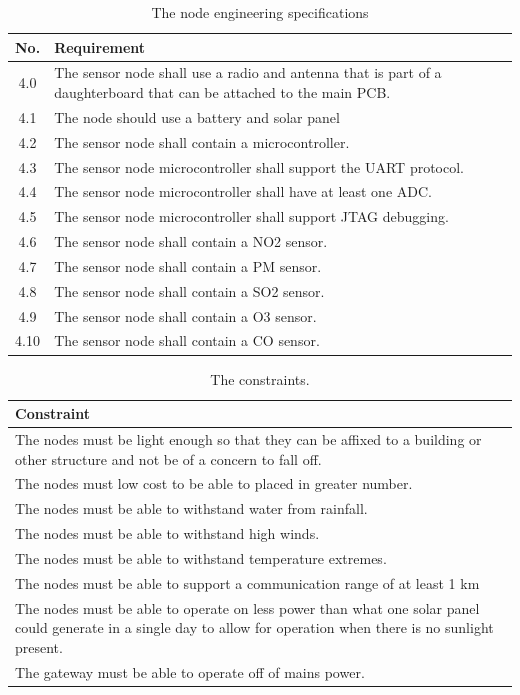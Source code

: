 \begin{table}[H]
\centering
\caption{The node engineering specifications}
\begin{tabularx}{\linewidth}{|c|X|}
\hline
No. & Requirement \\
\hline\hline
4.0 & The sensor node shall use a radio and antenna that is part of a daughterboard that can be attached to the main PCB.\\\hline
4.1 & The node should use a battery and solar panel \\\hline
4.2 & The sensor node shall contain a microcontroller. \\\hline
4.3 & The sensor node microcontroller shall support the UART protocol.\\\hline
4.4 & The sensor node microcontroller shall have at least one ADC.\\\hline
4.5 & The sensor node microcontroller shall support JTAG debugging.\\\hline
4.6 & The sensor node shall contain a NO2 sensor.\\\hline
4.7 & The sensor node shall contain a PM sensor.\\\hline
4.8 & The sensor node shall contain a SO2 sensor.\\\hline
4.9 & The sensor node shall contain a O3 sensor.\\\hline
4.10 & The sensor node shall contain a CO sensor.\\\hline
\end{tabularx}
\label{tab:nodeSpecs}
\end{table}

\begin{table}[H]
\centering
\caption{The constraints.}
\begin{tabularx}{\linewidth}{|X|}
\hline
Constraint \\
\hline
The nodes must be light enough so that they can be affixed to a building or other structure and not be of a concern to fall off.\\\hline
The nodes must low cost to be able to placed in greater number. \\\hline
The nodes must be able to withstand water from rainfall.\\\hline
The nodes must be able to withstand high winds. \\\hline
The nodes must be able to withstand temperature extremes. \\\hline
The nodes must be able to support a communication range of at least 1 km\\\hline
The nodes must be able to operate on less power than what one solar panel could generate in a single day to allow for operation when there is no sunlight present.\\\hline
The gateway must be able to operate off of mains power.\\\hline
\end{tabularx}
\label{tab:constraints}
\end{table}

